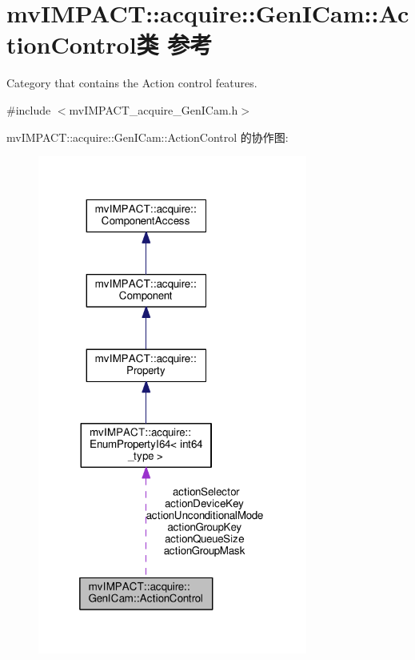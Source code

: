 \hypertarget{classmv_i_m_p_a_c_t_1_1acquire_1_1_gen_i_cam_1_1_action_control}{\section{mv\+I\+M\+P\+A\+C\+T\+:\+:acquire\+:\+:Gen\+I\+Cam\+:\+:Action\+Control类 参考}
\label{classmv_i_m_p_a_c_t_1_1acquire_1_1_gen_i_cam_1_1_action_control}
}


Category that contains the Action control features.  




{\ttfamily \#include $<$mv\+I\+M\+P\+A\+C\+T\+\_\+acquire\+\_\+\+Gen\+I\+Cam.\+h$>$}



mv\+I\+M\+P\+A\+C\+T\+:\+:acquire\+:\+:Gen\+I\+Cam\+:\+:Action\+Control 的协作图\+:
\nopagebreak
\begin{figure}[H]
\begin{center}
\leavevmode
\includegraphics[width=251pt]{classmv_i_m_p_a_c_t_1_1acquire_1_1_gen_i_cam_1_1_action_control__coll__graph}
\end{center}
\end{figure}
